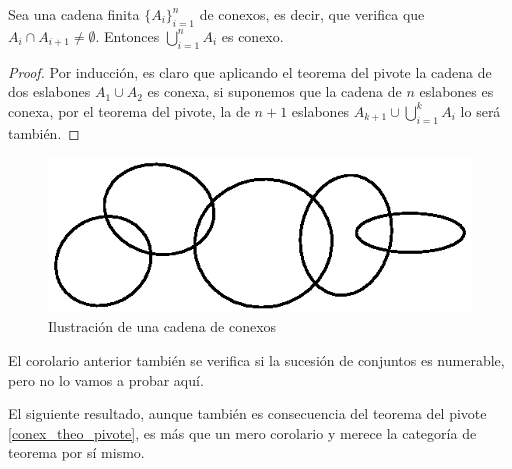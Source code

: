 \begin{cor}[Cadenas]
	Sea una cadena finita $\{A_i\}_{i=1}^n$ de conexos, es decir, que verifica que $A_i\cap A_{i+1}\not=\emptyset$. Entonces $\bigcup_{i=1}^n A_i$ es conexo.
\end{cor}
\begin{proof}
	Por inducción, es claro que aplicando el teorema del pivote la cadena de dos eslabones $A_1\cup A_2$ es conexa, si suponemos que la cadena de $n$ eslabones es conexa, por el teorema del pivote, la de $n+1$ eslabones $A_{k+1}\cup\bigcup_{i=1}^k A_i$ lo será también.
\end{proof}
\begin{figure}[H]
	\centering
	\includegraphics[scale = 0.5]{img/pivote_variante3}
	\caption{Ilustración de una cadena de conexos}
\end{figure}
\begin{obs}
	El corolario anterior también se verifica si la sucesión de conjuntos es numerable, pero no lo vamos a probar aquí.
\end{obs}

El siguiente resultado, aunque también es consecuencia del teorema del pivote \ref{conex_theo_pivote}, es más que un mero corolario y merece la categoría de teorema por sí mismo.

